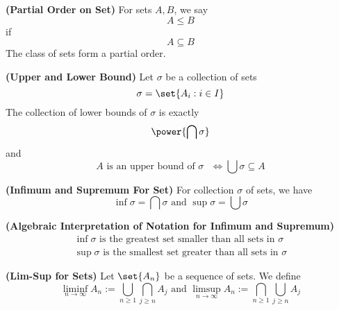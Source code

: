\documentclass{report}
\begin{document}
\begin{definition}
\label{0.7.6}
\textbf{(Partial Order on Set)} For sets $A,B$, we say
 \begin{equation*}
A\leq B
\end{equation*}
if
\begin{equation*}
A\subseteq B
\end{equation*}
The class of sets form a partial order.
\end{definition}
\begin{theorem}
\label{0.7.7}
\textbf{(Upper and Lower Bound)} Let $\sigma$ be a collection of sets
\begin{equation*}
\sigma=\set{A_i:i\in I}
\end{equation*}
The collection of lower bounds of $\sigma$ is exactly
\begin{equation*}
\power{\bigcap \sigma}
\end{equation*}
and 
\begin{equation*}
A\text{ is an upper bound of $\sigma$ }\iff \bigcup \sigma \subseteq A
\end{equation*}
\end{theorem}
\begin{definition}
\label{0.7.8}
\textbf{(Infimum and Supremum For Set)} For collection $\sigma$ of sets, we have
\begin{equation*}
\inf \sigma= \bigcap \sigma\text{ and }\sup \sigma=\bigcup \sigma
\end{equation*}
\end{definition}
\begin{theorem}
\label{0.7.9}
\textbf{(Algebraic Interpretation of Notation for Infimum and Supremum)} 
\begin{gather*}
\inf\sigma\text{ is the greatest set smaller than all sets in }\sigma\\
\sup \sigma\text{ is the smallest set greater than all sets in }\sigma
\end{gather*}
\end{theorem}
\begin{definition}
\label{0.7.10}
\textbf{(Lim-Sup for Sets)} Let $\set{A_n}$ be a sequence of sets. We define
\begin{equation*}
\liminf_{n\to\infty} A_n:=\bigcup_{n\geq 1}\bigcap_{j\geq n}A_j\text{ and }\limsup_{n\to\infty} A_n:=\bigcap_{n\geq 1}\bigcup _{j\geq n}A_j
\end{equation*}
\end{definition}
\end{document}
